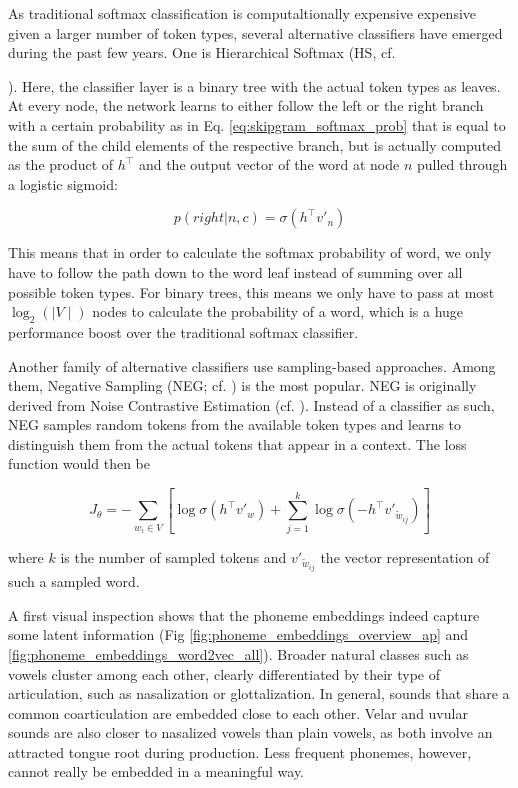 \documentclass[8pt]{article}
\begin{document}
As traditional softmax classification is computaltionally expensive expensive given a larger number of token types, several alternative classifiers have emerged during the past few years. One is Hierarchical Softmax (HS, cf. {\cite{morin2005hierarchical}). Here, the classifier layer is a binary tree with the actual token types as leaves. At every node, the network learns to either follow the left or the right branch with a certain probability as in Eq. \ref{eq:skipgram_softmax_prob} that is equal to the sum of the child elements of the respective  branch, but is actually computed as the product of $h^\top$ and the output vector of the word at node $n$ pulled through a logistic sigmoid:

\begin{equation}
p(right|n,c) = \sigma(h^\top v'_n) 
\label{eq:hierarchicalsoftmax_nodeprob}
\end{equation}

This means that in order to calculate the softmax probability of word, we only have to follow the path down to the word leaf instead of summing over all possible token types. For binary trees, this means we only have to pass at most $\log_2(\mid V\mid)$ nodes to calculate the probability of a word, which is a huge performance boost over the traditional softmax classifier. 

Another family of alternative classifiers use sampling-based approaches. Among them, Negative Sampling (NEG; cf. \cite{goldberg2014word2vec}) is the most popular. NEG is originally derived from Noise Contrastive Estimation (cf. \cite{gutmann2010noise,mnih2012fast}). Instead of a classifier as such, NEG samples random tokens from the available token types and learns to distinguish them from the actual tokens that appear in a context. The loss function would then be

\begin{equation}
J_{\theta}  = - \sum_{w_i \in V} [\log \sigma(h^{\top}v'_w)
+ \sum_{j=1}^{k}\log \sigma(-h^{\top}v'_{\tilde{w}_{ij}})]
\label{eq:neg_sampling_3}
\end{equation}

where $k$ is the number of sampled tokens and $v'_{\tilde{w}_{ij}}$ the vector representation of such a sampled word.

A first visual inspection shows that the phoneme embeddings indeed capture some latent information (Fig \ref{fig:phoneme_embeddings_overview_ap} and \ref{fig:phoneme_embeddings_word2vec_all}). Broader natural classes such as vowels cluster among each other,  clearly differentiated by their type of articulation, such as nasalization or glottalization. In general, sounds that share a common coarticulation are embedded close to each other. Velar and uvular sounds are also closer to nasalized vowels than plain vowels, as both involve an attracted tongue root during production. Less frequent phonemes, however, cannot really be embedded in a meaningful way.

}
\end{document}
